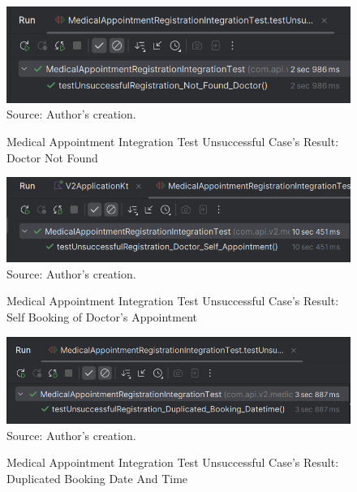\begin{figure}[H]
	\centering
	\caption{Medical Appointment Integration Test Unsuccessful Case's Result: Doctor Not Found}
	\includegraphics[width=1\linewidth]{figures/medical_appointment_registration_integration_test_unsuccessful_result_doctor_not_found.png}
	\label{medical_appointment_registration_integration_test_unsuccessful_result_doctor_not_found}
	\footnotesize Source: Author's creation.
\end{figure}

\begin{figure}[H]
	\centering
	\caption{Medical Appointment Integration Test Unsuccessful Case's Result: Self Booking of Doctor's Appointment}
	\includegraphics[width=1\linewidth]{figures/medical_appointment_registration_integration_test_unsuccessful_result_doctor_self_appointment.png}
	\label{medical_appointment_registration_integration_test_unsuccessful_result_doctor_self_appointment}
	\footnotesize Source: Author's creation.
\end{figure}

\begin{figure}[H]
	\centering
	\caption{Medical Appointment Integration Test Unsuccessful Case's Result: Duplicated Booking Date And Time}
	\includegraphics[width=1\linewidth]{figures/medical_appointment_registration_integration_test_unsuccessful_result_duplicated_booking_datetime.png}
	\label{medical_appointment_registration_integration_test_unsuccessful_result_duplicated_booking_datetime}
	\footnotesize Source: Author's creation.
\end{figure}

